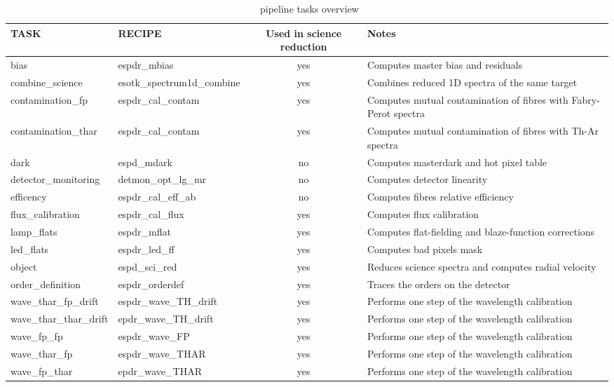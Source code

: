 \begin{table}[htbp]
\centering
\scriptsize
\begin{tabular}{|l|l|c|p{7cm}|}
\hline
\textbf{TASK} & \textbf{RECIPE} & \textbf{Used in science reduction} & \textbf{Notes} \\
\hline
bias                     & espdr\_mbias                & yes & Computes master bias and residuals \\
combine\_science         & esotk\_spectrum1d\_combine  & yes & Combines reduced 1D spectra of the same target\\ 
contamination\_fp        & espdr\_cal\_contam          & yes & Computes mutual contamination of fibres with Fabry-Perot spectra\\
contamination\_thar      & espdr\_cal\_contam          & yes & Computes mutual contamination of fibres with Th-Ar spectra\\
dark                     & espd\_mdark                 & no  & Computes masterdark and hot pixel table\\
detector\_monitoring     & detmon\_opt\_lg\_mr         & no  & Computes detector linearity\\
efficency                & espdr\_cal\_eff\_ab         & no  & Computes fibres relative efficiency\\
flux\_calibration        & espdr\_cal\_flux            & yes & Computes flux calibration\\
lamp\_flats              & espdr\_mflat                & yes & Computes flat-fielding and blaze-function corrections\\
led\_flats               & espdr\_led\_ff              & yes & Computes bad pixels mask \\
object                   & espd\_sci\_red              & yes & Reduces science spectra and computes radial velocity\\ 
order\_definition        & espdr\_orderdef             & yes & Traces the orders on the detector\\
wave\_thar\_fp\_drift    & espdr\_wave\_TH\_drift      & yes & Performs one step of the wavelength calibration\\
wave\_thar\_thar\_drift  & epdr\_wave\_TH\_drift       & yes & Performs one step of the wavelength calibration\\
wave\_fp\_fp             & espdr\_wave\_FP             & yes & Performs one step of the wavelength calibration\\
wave\_thar\_fp           & espdr\_wave\_THAR           & yes & Performs one step of the wavelength calibration\\
wave\_fp\_thar           & epdr\_wave\_THAR            & yes & Performs one step of the wavelength calibration\\
\hline
\end{tabular}
\caption{\instname\ pipeline tasks overview}
\end{table}



